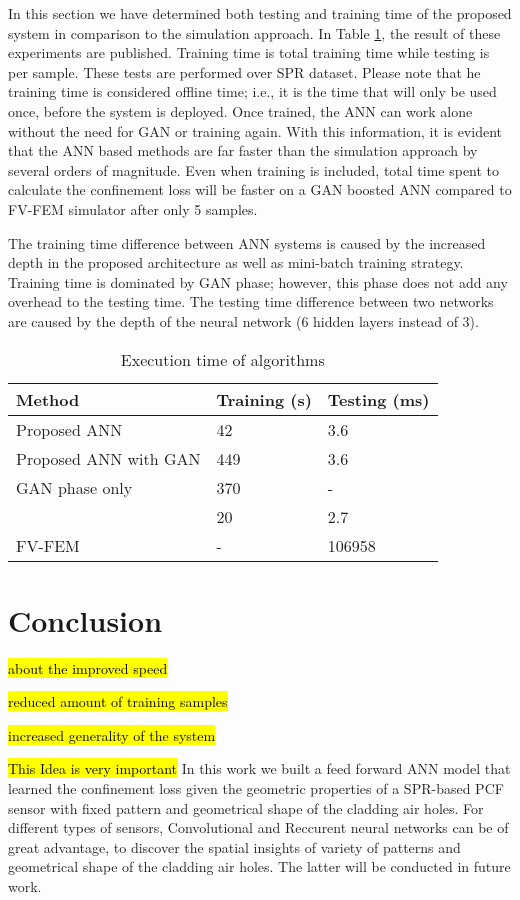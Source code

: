 \documentclass[draft, 10pt]{IEEEtran}
\begin{document}
In this section we have determined both testing and training time of the proposed system in comparison to the simulation approach. In Table \ref{tbl:timing}, the result of these experiments are published. Training time is total training time while testing is per sample. These tests are performed over SPR dataset. Please note that he training time is considered offline time; i.e., it is the time that will only be used once, before the system is deployed. Once trained, the ANN can work alone without the need for GAN or training again. With this information, it is evident that the ANN based methods are far faster than the simulation approach by several orders of magnitude. Even when training is included, total time spent to calculate the confinement loss will be faster on a GAN boosted ANN compared to FV-FEM simulator after only 5 samples.

The training time difference between ANN systems is caused by the increased depth in the proposed architecture as well as mini-batch training strategy. Training time is dominated by GAN phase; however, this phase does not add any overhead to the testing time. The testing time difference between two networks are caused by the depth of the neural network (6 hidden layers instead of 3). 

\begin{table}
\caption{Execution time of algorithms}
\begin{tabular}{l|l|l}
Method    			  &  Training (s) & Testing (ms) \\\hline
Proposed ANN 		  &  42 & 3.6 \\
Proposed ANN with GAN & 449 & 3.6 \\
GAN phase only        & 370 &  -  \\
\cite{paper0}		  &  20 & 2.7 \\
FV-FEM		   		  &  -  & 106958
\end{tabular}
\label{tbl:timing}
\end{table}

\section{Conclusion}
\label{sec:conc}

\hl{about the improved speed}

\hl{reduced amount of training samples}

\hl{increased generality of the system}

\hl{This Idea is very important}
In this work we built a feed forward ANN model that learned the confinement loss given the geometric properties of a SPR-based PCF sensor with fixed pattern and geometrical shape of the cladding air holes. For different types of sensors, Convolutional and Reccurent neural networks can be of great advantage, to discover the spatial insights of variety of patterns and  geometrical shape of the cladding air holes. The latter will be conducted in future work.
\end{document}
